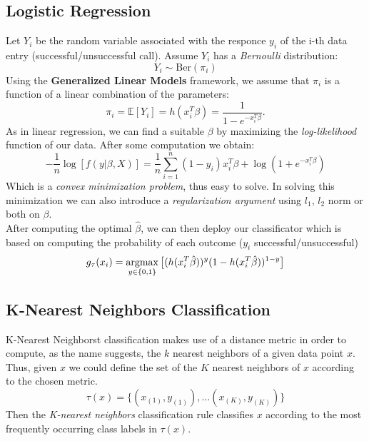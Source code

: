 \subsection{Logistic Regression}
Let \(Y_i\) be the random variable associated with the responce \(y_i\) of the i-th data entry (successful/unsuccessful call). Assume \(Y_i\) has a \textit{Bernoulli} distribution:
\begin{equation}
    Y_i \sim \text{Ber}(\pi_i)
\end{equation}
Using the \textbf{Generalized Linear Models} framework, we assume that \(\pi_i\) is a function of a linear combination of the parameters:
\begin{equation}
    \pi_i = \mathbb{E}[Y_i] = h(x_i^T\beta) = \frac{1}{1- e^{- x_i^T\beta}}.
\end{equation}
As in linear regression, we can find a suitable \(\beta\) by maximizing the \textit{log-likelihood} function of our data. After some computation we obtain:
\begin{equation}
    -\frac{1}{n} \log[f(y|\beta,X)] = \frac{1}{n}  \sum \limits_{i= 1}^{n} (1- y_i) x_i^T \beta + \log(1+ e^{- x_i^T\beta})
\end{equation}
Which is a \textit{convex minimization problem}, thus easy to solve. In solving this minimization we can also introduce a \textit{regularization argument} using \(l_1\), \(l_2\) norm or both on \(\beta\).\\
After computing the optimal \(\hat{\beta}\), we can then deploy our classificator which is based on computing the probability of each outcome (\(y_i\) successful/unsuccessful)
\begin{equation}
    g_\tau(x_i) = \operatorname*{argmax}_{y \in \{0, 1\}} \big[ (h(x_i^T\hat{\beta}))^{y}(1-h(x_i^T\hat{\beta}))^{1- y} \big] 
\end{equation}

\subsection{K-Nearest Neighbors Classification}
K-Nearest Neighborst classification makes use of a distance metric in order to compute, as the name suggests, the \(k\) nearest neighbors of a given data point \(x\). Thus, given \(x\) we could define the set of the \(K\) nearest neighbors of \(x\) according to the chosen metric. 
\begin{equation*}
    \tau(x) =\{ (x_{(1)}, y_{(1)}), \dots (x_{(K)}, y_{(K)})\}
\end{equation*}
Then the \textit{K-nearest neighbors} classification rule classifies \(x\) according to the most frequently occurring class labels in \(\tau(x)\).